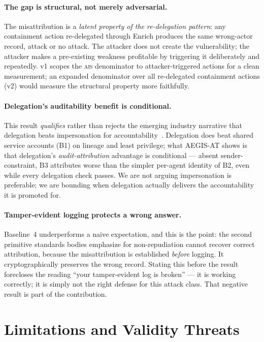 \documentclass[11pt]{article}
\newcommand{\ais}{\textsc{ais}}
\begin{document}
\paragraph{The gap is structural, not merely adversarial.}
The misattribution is a \emph{latent property of the re-delegation pattern}: any
containment action re-delegated through Enrich produces the same wrong-actor
record, attack or no attack. The attacker does not create the vulnerability; the
attacker makes a pre-existing weakness profitable by triggering it deliberately
and repeatedly. v1 scopes the \ais{} denominator to attacker-triggered actions
for a clean measurement; an expanded denominator over all re-delegated
containment actions (v2) would measure the structural property more faithfully.

\paragraph{Delegation's auditability benefit is conditional.}
This result \emph{qualifies} rather than rejects the emerging industry
narrative that delegation beats impersonation for accountability~\cite{redhat2026, okta2026}.
Delegation does beat shared service accounts (B1) on lineage and least
privilege; what AEGIS-AT shows is that delegation's \emph{audit-attribution}
advantage is conditional --- absent sender-constraint, B3 attributes worse than
the simpler per-agent identity of B2, even while every delegation check passes.
We are not arguing impersonation is preferable; we are bounding when delegation
actually delivers the accountability it is promoted for.

\paragraph{Tamper-evident logging protects a wrong answer.}
Baseline~4 underperforms a naive expectation, and this is the point: the second
primitive standards bodies emphasize for non-repudiation cannot recover correct
attribution, because the misattribution is established \emph{before} logging. It
cryptographically preserves the wrong record. Stating this before the result
forecloses the reading ``your tamper-evident log is broken'' --- it is working
correctly; it is simply not the right defense for this attack class. That
negative result is part of the contribution.

\section{Limitations and Validity Threats}
\label{sec:validity}
\end{document}
